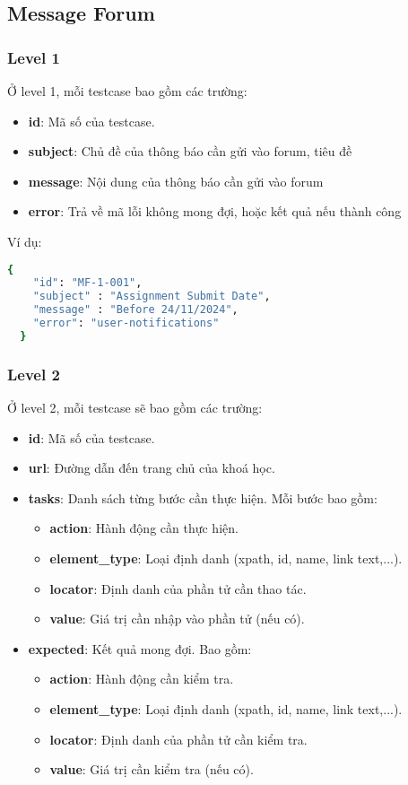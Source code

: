 \subsection{Message Forum}
\subsubsection{Level 1}
Ở level 1, mỗi testcase bao gồm các trường:
\begin{itemize}
    \item \textbf{id}: Mã số của testcase.
    \item \textbf{subject}: Chủ đề của thông báo cần gửi vào forum, tiêu đề
    \item \textbf{message}: Nội dung của thông báo cần gửi vào forum
    \item \textbf{error}: Trả về mã lỗi không mong đợi, hoặc kết quả nếu thành công
\end{itemize}

Ví dụ:
\begin{lstlisting}[language=bash, caption={Ví dụ testcase MF-1-001 ở level 1}]
    {
    "id": "MF-1-001",
    "subject" : "Assignment Submit Date",
    "message" : "Before 24/11/2024",
    "error": "user-notifications"  
  }
\end{lstlisting}
\subsubsection{Level 2}

Ở level 2, mỗi testcase sẽ bao gồm các trường:
\begin{itemize}
    \item \textbf{id}: Mã số của testcase.
    \item \textbf{url}: Đường dẫn đến trang chủ của khoá học.
    \item \textbf{tasks}: Danh sách từng bước cần thực hiện. Mỗi bước bao gồm:
\begin{itemize}
    \item \textbf{action}: Hành động cần thực hiện.
    \item \textbf{element\_type}: Loại định danh (xpath, id, name, link text,...).
    \item \textbf{locator}: Định danh của phần tử cần thao tác.
    \item \textbf{value}: Giá trị cần nhập vào phần tử (nếu có).
\end{itemize}
    \item \textbf{expected}: Kết quả mong đợi. Bao gồm:
\begin{itemize}
    \item \textbf{action}: Hành động cần kiểm tra.
    \item \textbf{element\_type}: Loại định danh (xpath, id, name, link text,...).
    \item \textbf{locator}: Định danh của phần tử cần kiểm tra.
    \item \textbf{value}: Giá trị cần kiểm tra (nếu có).
\end{itemize}
\end{itemize}

